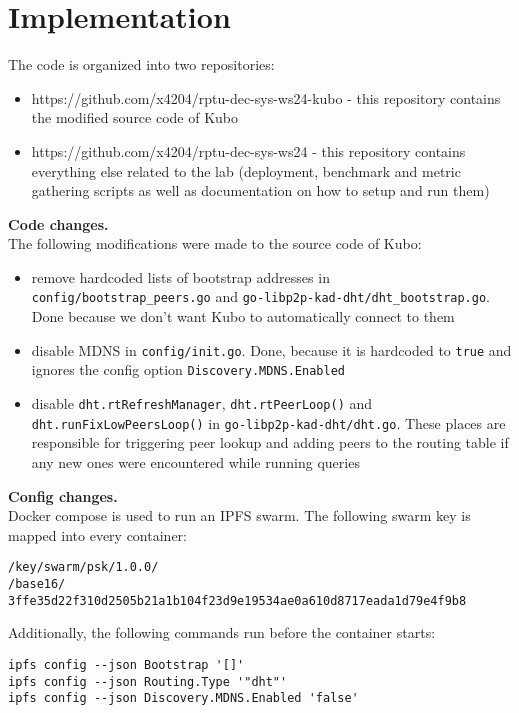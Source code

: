 \section{Implementation}

The code is organized into two repositories:
\begin{itemize}
\item https://github.com/x4204/rptu-dec-sys-ws24-kubo - this repository
contains the modified source code of Kubo
\item https://github.com/x4204/rptu-dec-sys-ws24 - this repository contains
everything else related to the lab (deployment, benchmark and metric gathering
scripts as well as documentation on how to setup and run them)
\end{itemize}

\textbf{Code changes.}\\
The following modifications were made to the source code of Kubo:
\begin{itemize}
\item remove hardcoded lists of bootstrap addresses in
\verb|config/bootstrap_peers.go| and \verb|go-libp2p-kad-dht/dht_bootstrap.go|.
Done because we don't want Kubo to automatically connect to them
\item disable MDNS in \verb|config/init.go|. Done, because it is hardcoded to
\verb|true| and ignores the config option \verb|Discovery.MDNS.Enabled|
\item disable \verb|dht.rtRefreshManager|, \verb|dht.rtPeerLoop()| and
\verb|dht.runFixLowPeersLoop()| in \verb|go-libp2p-kad-dht/dht.go|. These
places are responsible for triggering peer lookup and adding peers to the
routing table if any new ones were encountered while running queries
\end{itemize}

\textbf{Config changes.}\\
Docker compose is used to run an IPFS swarm. The following swarm key is mapped
into every container:
\begin{lstlisting}
/key/swarm/psk/1.0.0/
/base16/
3ffe35d22f310d2505b21a1b104f23d9e19534ae0a610d8717eada1d79e4f9b8
\end{lstlisting}

Additionally, the following commands run before the container starts:
\begin{lstlisting}
ipfs config --json Bootstrap '[]'
ipfs config --json Routing.Type '"dht"'
ipfs config --json Discovery.MDNS.Enabled 'false'
\end{lstlisting}

